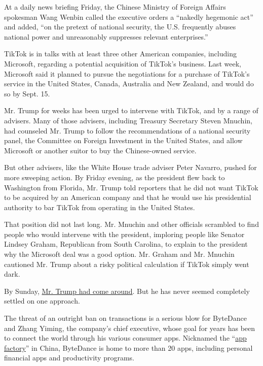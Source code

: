 At a daily news briefing Friday, the Chinese Ministry of Foreign Affairs
spokesman Wang Wenbin called the executive orders a ``nakedly hegemonic
act'' and added, ``on the pretext of national security, the U.S.
frequently abuses national power and unreasonably suppresses relevant
enterprises.''

TikTok is in talks with at least three other American companies,
including Microsoft, regarding a potential acquisition of TikTok's
business. Last week, Microsoft said it planned to pursue the
negotiations for a purchase of TikTok's service in the United States,
Canada, Australia and New Zealand, and would do so by Sept. 15.

Mr. Trump for weeks has been urged to intervene with TikTok, and by a
range of advisers. Many of those advisers, including Treasury Secretary
Steven Mnuchin, had counseled Mr. Trump to follow the recommendations of
a national security panel, the Committee on Foreign Investment in the
United States, and allow Microsoft or another suitor to buy the
Chinese-owned service.

But other advisers, like the White House trade adviser Peter Navarro,
pushed for more sweeping action. By Friday evening, as the president
flew back to Washington from Florida, Mr. Trump told reporters that he
did not want TikTok to be acquired by an American company and that he
would use his presidential authority to bar TikTok from operating in the
United States.

That position did not last long. Mr. Mnuchin and other officials
scrambled to find people who would intervene with the president,
imploring people like Senator Lindsey Graham, Republican from South
Carolina, to explain to the president why the Microsoft deal was a good
option. Mr. Graham and Mr. Mnuchin cautioned Mr. Trump about a risky
political calculation if TikTok simply went dark.

By Sunday,
\href{https://www.nytimes3xbfgragh.onion/2020/08/02/business/economy/trump-tiktok-china-national-security.html}{Mr.
Trump had come around}. But he has never seemed completely settled on
one approach.

The threat of an outright ban on transactions is a serious blow for
ByteDance and Zhang Yiming, the company's chief executive, whose goal
for years has been to connect the world through his various consumer
apps. Nicknamed the
``\href{https://qz.com/1803609/all-the-apps-run-by-tiktoks-chinese-owner-bytedance/\#:~:text=Although\%20most\%20often\%20described\%20as,news\%20aggregator\%20to\%20productivity\%20management}{app
factory}'' in China, ByteDance is home to more than 20 apps, including
personal financial apps and productivity programs.

